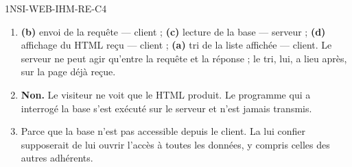 \begin{corrige}{1NSI-WEB-IHM-RE-C4}
\begin{enumerate}
  \item \textbf{(b)} envoi de la requête — client ; \textbf{(c)} lecture de la base — serveur ;
        \textbf{(d)} affichage du HTML reçu — client ; \textbf{(a)} tri de la liste affichée —
        client. Le serveur ne peut agir qu'entre la requête et la réponse ; le tri, lui, a lieu
        après, sur la page déjà reçue.
  \item \textbf{Non.} Le visiteur ne voit que le HTML produit. Le programme qui a interrogé la
        base s'est exécuté sur le serveur et n'est jamais transmis.
  \item Parce que la base n'est pas accessible depuis le client. La lui confier supposerait de
        lui ouvrir l'accès à toutes les données, y compris celles des autres adhérents.
\end{enumerate}
\end{corrige}
